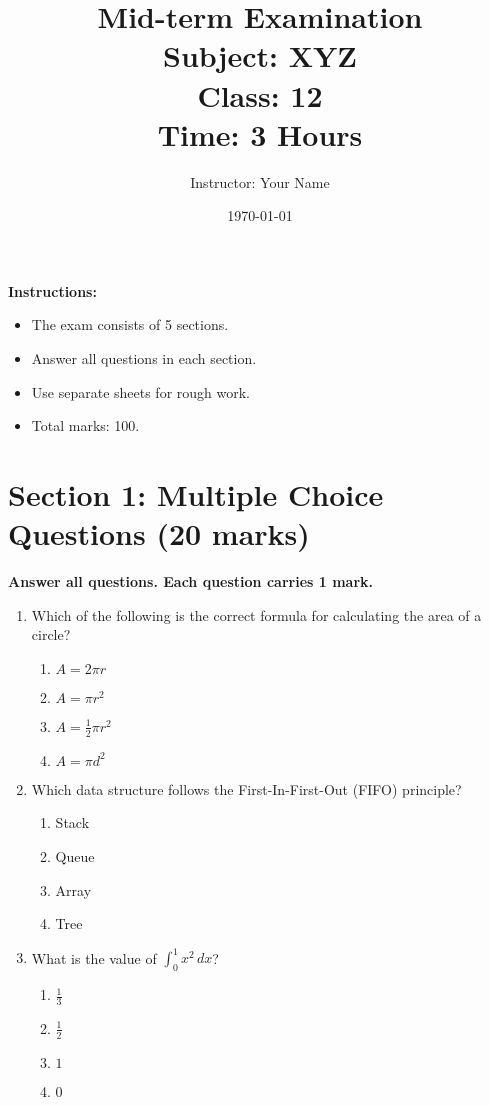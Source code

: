 \documentclass[a4paper,12pt]{article}   %
\title{Mid-term Examination \\ Subject: XYZ \\ Class: 12 \\ Time: 3 Hours}
\author{Instructor: Your Name}
\date{\today}
\begin{document}
	
	\maketitle                                     %
	
	\noindent\textbf{Instructions:}
	\begin{itemize}
		\item The exam consists of 5 sections.
		\item Answer all questions in each section.
		\item Use separate sheets for rough work.
		\item Total marks: 100.
	\end{itemize}
	
	\section*{Section 1: Multiple Choice Questions (20 marks)}
	\noindent\textbf{Answer all questions. Each question carries 1 mark.}
	
	\begin{enumerate}
		\item Which of the following is the correct formula for calculating the area of a circle?
		\begin{enumerate}[label=(\alph*)]
			\item \(A = 2\pi r\)
			\item \(A = \pi r^2\)
			\item \(A = \frac{1}{2}\pi r^2\)
			\item \(A = \pi d^2\)
		\end{enumerate}
		
		\item Which data structure follows the First-In-First-Out (FIFO) principle?
		\begin{enumerate}[label=(\alph*)]
			\item Stack
			\item Queue
			\item Array
			\item Tree
		\end{enumerate}
		
		\item What is the value of \( \int_0^1 x^2 \, dx \)?
		\begin{enumerate}[label=(\alph*)]
			\item \( \frac{1}{3} \)
			\item \( \frac{1}{2} \)
			\item \( 1 \)
			\item \( 0 \)
		\end{enumerate}
	\end{enumerate}
	
\end{document}
